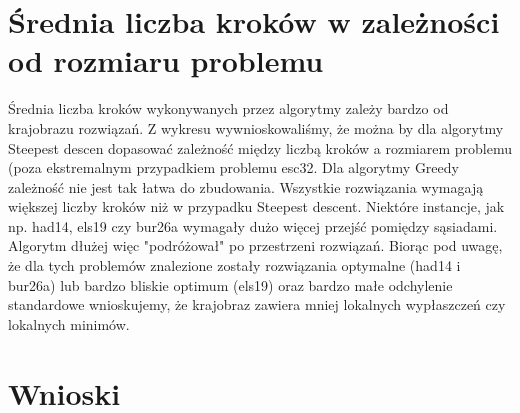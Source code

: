 \documentclass[a4paper,10pt]{article}
\begin{document}
\section{Średnia liczba kroków w zależności od rozmiaru problemu}
Średnia liczba kroków wykonywanych przez algorytmy zależy bardzo od krajobrazu rozwiązań.
Z wykresu wywnioskowaliśmy, że można by dla algorytmy Steepest descen dopasować zależność między liczbą kroków a rozmiarem problemu (poza ekstremalnym przypadkiem problemu esc32.
Dla algorytmy Greedy zależność nie jest tak łatwa do zbudowania.
Wszystkie rozwiązania wymagają większej liczby kroków niż w przypadku Steepest descent. 
Niektóre instancje, jak np. had14, els19 czy bur26a wymagały dużo więcej przejść pomiędzy sąsiadami.
Algorytm dłużej więc "podróżował" po przestrzeni rozwiązań.
Biorąc pod uwagę, że dla tych problemów znalezione zostały rozwiązania optymalne (had14 i bur26a) lub bardzo bliskie optimum (els19) oraz bardzo małe odchylenie standardowe wnioskujemy, że krajobraz zawiera mniej lokalnych wypłaszczeń czy lokalnych minimów.

\begin{center}

\end{center}

\begin{center}


\end{center}

\section{Wnioski}
\end{document}
